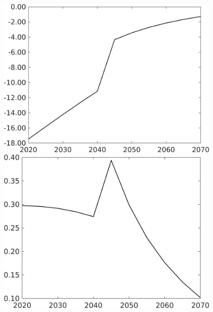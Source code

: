 \documentclass[12pt]{article}
\begin{document}
\begin{figure}[h!!]
\begin{minipage}[]{0.32\textwidth}
\end{minipage}		
\begin{minipage}[]{0.32\textwidth}
\includegraphics[width=1\textwidth]{../../codding_model/own_basedOnFried/optimalPol_010922_revision/figures/all_13Sept22/CompTaufPER_bytaul_Reg0_gAg_spillover0_nsk0_xgr0_knspil0_sep0_LFlimit1_emsbase0_countec0_GovRev0_etaa0.79_lgd0.png}
\end{minipage}
\begin{minipage}[]{0.32\textwidth}
\includegraphics[width=1\textwidth]{../../codding_model/own_basedOnFried/optimalPol_010922_revision/figures/all_13Sept22/CompTaufPER_bytaul_Reg0_gAn_spillover0_nsk0_xgr0_knspil0_sep0_LFlimit1_emsbase0_countec0_GovRev0_etaa0.79_lgd0.png}

\end{minipage}
\end{figure}
\end{document}
